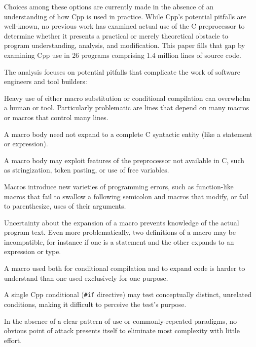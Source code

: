 \documentclass[10pt]{article}
\def\numpackages{26}
\def\numlines{1.4 million}      %
\begin{document}
Choices among these options are currently made in the absence of
an understanding of how Cpp is used in practice.
While  Cpp's potential pitfalls are well-known, no
previous work has examined actual use of the C preprocessor to
determine whether it presents a practical or merely theoretical
obstacle to program understanding, analysis, and modification.  This
paper fills that gap by examining Cpp use in {\numpackages} programs
comprising {\numlines} lines of source code.

The analysis focuses on potential pitfalls that complicate the work of
software engineers and tool builders:
\begin{description}\itemsep 0pt \parskip 0pt
\item[high total use {\rm (Sections~\ref{sec:directives}, \ref{sec:macro-usage}, and~\ref{sec:dependence}):}]
  Heavy use of either macro substitution or conditional compilation can
  overwhelm a human or tool.  Particularly problematic are lines that
  depend on many macros or macros that control many lines.
\item[complicated bodies {\rm (Section~\ref{sec:categorization}):}]
  A macro body need not expand to a complete C syntactic entity (like a
  statement or expression).
\item[extra-linguistic features {\rm (Section~\ref{sec:extra-linguistic}):}]
  A macro body may exploit features of the preprocessor not available in C,
  such as stringization, token pasting, or use of free variables.
\item[macro pitfalls {\rm (Section~\ref{sec:lint}):}]
  Macros introduce new varieties of programming errors, such as
  function-like macros that fail to swallow a following semicolon and
  macros that modify, or fail to parenthesize, uses of their arguments.
\item[multiple definitions {\rm (Sections~\ref{sec:mult-def}--\ref{sec:inconsistent}):}]
  Uncertainty about the expansion of a macro prevents knowledge of the
  actual program text.  Even more problematically, two definitions of a
  macro may be incompatible, for instance if one is a statement and the
  other expands to an expression or type.
\item[inconsistent usage {\rm (Section~\ref{sec:inconsistent-usage}):}]
  A macro used both for conditional compilation and to expand code is
  harder to understand than one used exclusively for one purpose.
\item[mixed tests {\rm (Section~\ref{sec:ccd}):}]
  A single Cpp conditional ({\tt \#if} directive) may test conceptually
  distinct, unrelated conditions, making it difficult to perceive the
  test's purpose.
\item[variation in use]
  In the absence of a clear pattern of use or commonly-repeated paradigms,
  no obvious point of attack presents itself to eliminate most complexity
  with little effort.
\end{description}
\end{document}
